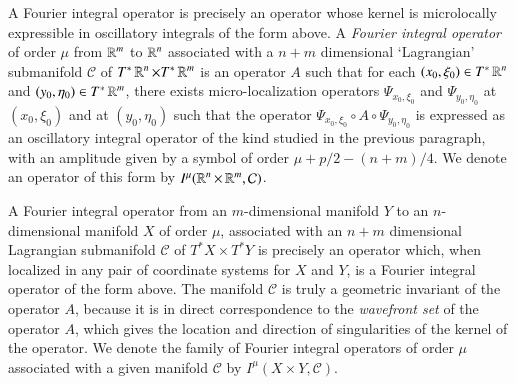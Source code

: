 %
%
%
%

A Fourier integral operator is precisely an operator whose kernel is microlocally expressible in oscillatory integrals of the form above. A \emph{Fourier integral operator} of order $\mu$ from $\operatorname{\mathbb{R}}^m$ to $\operatorname{\mathbb{R}}^n$ associated with a $n + m$ dimensional `Lagrangian' submanifold $\mathcal{C}$ of $T^* \operatorname{\mathbb{R}}^n \times T^* \operatorname{\mathbb{R}}^m$ is an operator $A$ such that for each $(x_0,\xi_0) \in T^* \operatorname{\mathbb{R}}^n$ and $(y_0,\eta_0) \in T^* \operatorname{\mathbb{R}}^m$, there exists micro-localization operators $\Psi_{x_0,\xi_0}$ and $\Psi_{y_0,\eta_0}$ at $(x_0,\xi_0)$ and at $(y_0,\eta_0)$ such that the operator $\Psi_{x_0,\xi_0} \circ A \circ \Psi_{y_0,\eta_0}$ is expressed as an oscillatory integral operator of the kind studied in the previous paragraph, with an amplitude given by a symbol of order $\mu + p/2 - (n+m)/4$. We denote an operator of this form by $I^\mu(\operatorname{\mathbb{R}}^n \times \operatorname{\mathbb{R}}^m,\mathcal{C})$.

A Fourier integral operator from an $m$-dimensional manifold $Y$ to an $n$-dimensional manifold $X$ of order $\mu$, associated with an $n + m$ dimensional Lagrangian submanifold $\mathcal{C}$ of $T^* X \times T^* Y$ is precisely an operator which, when localized in any pair of coordinate systems for $X$ and $Y$, is a Fourier integral operator of the form above. The manifold $\mathcal{C}$ is truly a geometric invariant of the operator $A$, because it is in direct correspondence to the \emph{wavefront set} of the operator $A$, which gives the location and direction of singularities of the kernel of the operator. We denote the family of Fourier integral operators of order $\mu$ associated with a given manifold $\mathcal{C}$ by $I^\mu(X \times Y,\mathcal{C})$.


